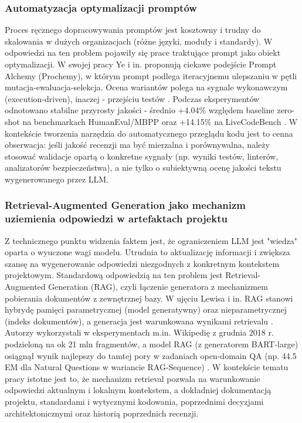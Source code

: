 \subsubsection{Automatyzacja optymalizacji promptów}
Proces ręcznego dopracowywania promptów jest kosztowny i trudny do skalowania w dużych organizacjach (różne języki, moduły i standardy).
W odpowiedzi na ten problem pojawiły się prace traktujące prompt jako obiekt optymalizacji. W swojej pracy Ye i in.
proponują ciekawe podejście Prompt Alchemy (Prochemy), w którym prompt podlega iteracyjnemu ulepszaniu w pętli mutacja-ewaluacja-selekcja.
Ocena wariantów polega na sygnale wykonawczym (execution-driven), inaczej - przejściu testów \cite{ye2025promptalchemy}.
Podczas eksperymentów odnotowano stabilne przyrosty jakości - średnio  \mbox{+4.04\%} względem baseline zero-shot 
na benchmarkach HumanEval/MBPP oraz \mbox{+14.15\%} na LiveCodeBench \cite{ye2025promptalchemy}. W kontekście tworzenia
narzędzia do automatycznego przeglądu kodu jest to cenna obserwacja: jeśli jakość recenzji ma być mierzalna i porównywalna,
należy stosować walidacje opartą o konkretne sygnały (np. wyniki testów, linterów, analizatorów bezpieczeństwa), a nie tylko
o subiektywną ocenę jakości tekstu wygenerowanego przez LLM.

\subsubsection{Retrieval-Augmented Generation jako mechanizm uziemienia odpowiedzi w artefaktach projektu}
Z technicznego punktu widzenia faktem jest, że ograniczeniem LLM jest "wiedza" oparta o wyuczone wagi modelu.
Utrudnia to aktualizację informacji i zwiększa szansę na wygenerowanie odpowiedzi niezgodnych z konkretnym kontekstem
projektowym. Standardową odpowiedzią na ten problem jest Retrieval-Augmented Generation (RAG), czyli łączenie
generatora z mechanizmem pobierania dokumentów z zewnętrznej bazy. W ujęciu Lewisa i in. RAG stanowi hybrydę 
pamięci parametrycznej (model generatywny) oraz nieparametrycznej (indeks dokumentów), a generacja jest warunkowana 
wynikami retrievalu \cite{lewis2020rag}. Autorzy wykorzystali w eksperymentach m.in. Wikipedię z grudnia 2018 r. podzieloną
na ok 21 mln fragmentów, a model RAG (z generatorem BART-large) osiągnął wynik najlepszy do tamtej pory w zadaniach
open-domain QA (np. \mbox{44.5} EM dla Natural Questions w wariancie RAG-Sequence) \cite{lewis2020rag}.
W kontekście tematu pracy istotne jest to, że mechanizm retrieval pozwala na warunkowanie odpowiedzi aktualnym i lokalnym
kontekstem, a dokładniej dokumentacją projektu, standardami i wytycznymi kodowania, poprzednimi decyzjami architektonicznymi
oraz historią poprzednich recenzji.


